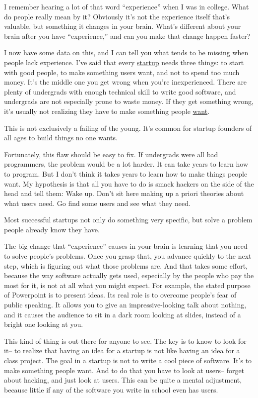 I remember hearing a lot of that word ``experience'' when I was in
college. What do people really mean by it? Obviously it's not the
experience itself that's valuable, but something it changes in your
brain. What's different about your brain after you have ``experience,''
and can you make that change happen faster?

I now have some data on this, and I can tell you what tends to be
missing when people lack experience. I've said that every
\href{start.html}{startup} needs three things: to start with good
people, to make something users want, and not to spend too much money.
It's the middle one you get wrong when you're inexperienced. There are
plenty of undergrads with enough technical skill to write good software,
and undergrads are not especially prone to waste money. If they get
something wrong, it's usually not realizing they have to make something
people \href{bronze.html}{want}.

This is not exclusively a failing of the young. It's common for startup
founders of all ages to build things no one wants.

Fortunately, this flaw should be easy to fix. If undergrads were all bad
programmers, the problem would be a lot harder. It can take years to
learn how to program. But I don't think it takes years to learn how to
make things people want. My hypothesis is that all you have to do is
smack hackers on the side of the head and tell them: Wake up. Don't sit
here making up a priori theories about what users need. Go find some
users and see what they need.

Most successful startups not only do something very specific, but solve
a problem people already know they have.

The big change that ``experience'' causes in your brain is learning that
you need to solve people's problems. Once you grasp that, you advance
quickly to the next step, which is figuring out what those problems are.
And that takes some effort, because the way software actually gets used,
especially by the people who pay the most for it, is not at all what you
might expect. For example, the stated purpose of Powerpoint is to
present ideas. Its real role is to overcome people's fear of public
speaking. It allows you to give an impressive-looking talk about
nothing, and it causes the audience to sit in a dark room looking at
slides, instead of a bright one looking at you.

This kind of thing is out there for anyone to see. The key is to know to
look for it-- to realize that having an idea for a startup is not like
having an idea for a class project. The goal in a startup is not to
write a cool piece of software. It's to make something people want. And
to do that you have to look at users-- forget about hacking, and just
look at users. This can be quite a mental adjustment, because little if
any of the software you write in school even has users.

